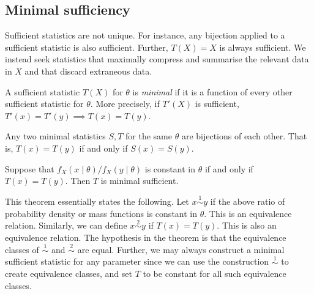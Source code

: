 \subsection{Minimal sufficiency}
Sufficient statistics are not unique.
For instance, any bijection applied to a sufficient statistic is also sufficient.
Further, \( T(X) = X \) is always sufficient.
We instead seek statistics that maximally compress and summarise the relevant data in \( X \) and that discard extraneous data.
\begin{definition}
	A sufficient statistic \( T(X) \) for \( \theta \) is \textit{minimal} if it is a function of every other sufficient statistic for \( \theta \).
	More precisely, if \( T'(X) \) is sufficient, \( T'(x) = T'(y) \implies T(x) = T(y) \).
\end{definition}
\begin{remark}
	Any two minimal statistics \( S, T \) for the same \( \theta \) are bijections of each other.
	That is, \( T(x) = T(y) \) if and only if \( S(x) = S(y) \).
\end{remark}
\begin{theorem}
	Suppose that \( f_X(x \mid \theta)/f_X(y \mid \theta) \) is constant in \( \theta \) if and only if \( T(x) = T(y) \).
	Then \( T \) is minimal sufficient.
\end{theorem}
\begin{remark}
	This theorem essentially states the following.
	Let \( x \overset{1}{\sim} y \) if the above ratio of probability density or mass functions is constant in \( \theta \).
	This is an equivalence relation.
	Similarly, we can define \( x \overset{2}{\sim} y \) if \( T(x) = T(y) \).
	This is also an equivalence relation.
	The hypothesis in the theorem is that the equivalence classes of \( \overset{1}{\sim} \) and \( \overset{2}{\sim} \) are equal.
	Further, we may always construct a minimal sufficient statistic for any parameter since we can use the construction \( \overset{1}{\sim} \) to create equivalence classes, and set \( T \) to be constant for all such equivalence classes.
\end{remark}
